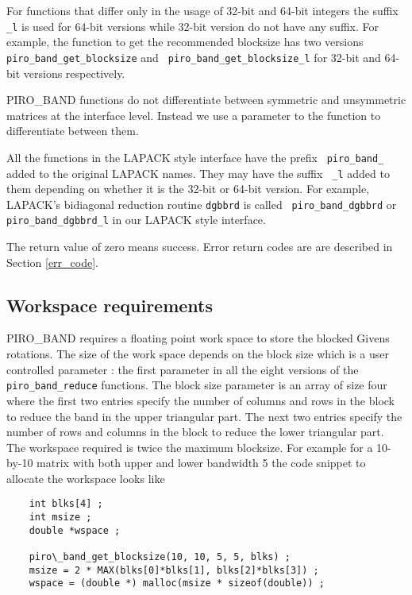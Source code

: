 \documentclass[11pt]{article}
\begin{document}
For functions that differ only in the usage of 32-bit and 64-bit integers the
suffix {\tt \_l} is used for 64-bit versions while 32-bit version do not have
any suffix. For example, the function to get the recommended blocksize has two
versions {\tt piro\_band\_get\_blocksize} and {\tt
piro\_band\_get\_blocksize\_l} for 32-bit and 64-bit versions respectively.

PIRO\_BAND functions do not differentiate between symmetric and unsymmetric
matrices at the interface level. Instead we use a parameter to the function to
differentiate between them.

All the functions in the LAPACK style interface have the prefix {\tt
piro\_band\_} added to the original LAPACK names. They may have the suffix {\tt
\_l} added to them depending on whether it is the 32-bit or 64-bit version. For
example, LAPACK's bidiagonal reduction routine {\tt dgbbrd} is called {\tt
piro\_band\_dgbbrd} or {\tt piro\_band\_dgbbrd\_l} in our LAPACK style
interface.

The return value of zero means success.  Error return codes are
are described in Section \ref{err_code}.

\subsection{Workspace requirements}

PIRO\_BAND requires a floating point work space to store the blocked Givens
rotations. The size of the work space depends on the block size which is a user
controlled parameter : the first parameter in all the eight versions of the
{\tt piro\_band\_reduce} functions. The block size parameter is an array of
size four where the first two entries specify the number of columns and rows in
the block to reduce the band in the upper triangular part. The next two entries
specify the number of rows and columns in the block to reduce the lower
triangular part.  The workspace required is twice the maximum blocksize. For
example for a 10-by-10 matrix with both upper and lower bandwidth 5 the code
snippet to allocate the workspace looks like

\begin{verbatim}
    int blks[4] ;
    int msize ;
    double *wspace ;

    piro\_band_get_blocksize(10, 10, 5, 5, blks) ;
    msize = 2 * MAX(blks[0]*blks[1], blks[2]*blks[3]) ;
    wspace = (double *) malloc(msize * sizeof(double)) ;
\end{verbatim}
\end{document}
